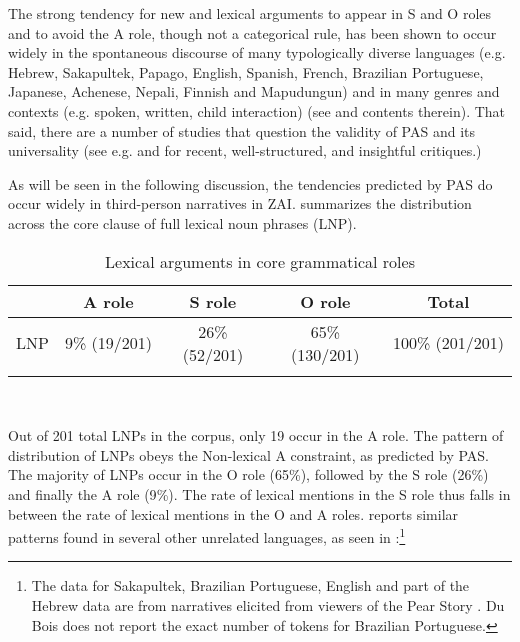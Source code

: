 The strong tendency for new and lexical arguments to appear in S and O roles and to avoid the A role, though not a categorical rule, has been shown to occur widely in the spontaneous discourse of many typologically diverse languages (e.g. Hebrew, Sakapultek, Papago, English, Spanish, French, Brazilian Portuguese, Japanese, Achenese, Nepali, Finnish and Mapudungun) and in many genres and contexts (e.g. spoken, written, child interaction) (see \citealt{dubois2003} and contents therein). That said, there are a number of studies that question the validity of PAS and its universality (see e.g. \citealt{haig2016} and \citealt{schnell2017} for recent, well-structured, and insightful critiques.)

As will be seen in the following discussion, the tendencies predicted by PAS do occur widely in third-person narratives in ZAI.  summarizes the distribution across the core clause of full lexical noun phrases (LNP).


\begin{table} 

\caption{{Lexical arguments in core grammatical roles}}
\begin{tabular}{ l  c  c  c  c }
\lsptoprule
 & A role & S role & O role &  {Total} \\

\midrule
 \textsc{LNP} & 9{\%} (19/201) & 26{\%}(52/201) & 65{\%} (130/201) & 100{\%} (201/201) \\
  
\lspbottomrule
\end{tabular}\\
\label{generaldist} 
\end{table}

Out of 201 total LNPs in the corpus, only 19 occur in the A role. The pattern of distribution of LNPs obeys the Non-lexical A constraint, as predicted by PAS. The majority of LNPs occur in the O role (65{\%}), followed by the S role (26{\%}) and finally the A role (9{\%}).  The rate of lexical mentions in the S role thus falls in between the rate of lexical mentions in the O and A roles. \citet[37]{dubois2003b} reports similar patterns found in several other unrelated languages, as seen in :\footnote{The data for Sakapultek, Brazilian Portuguese, English and part of the Hebrew data are from narratives elicited from viewers of the Pear Story \citep[62-63]{dubois2003a}. Du Bois does not report the exact number of tokens for Brazilian Portuguese.}


